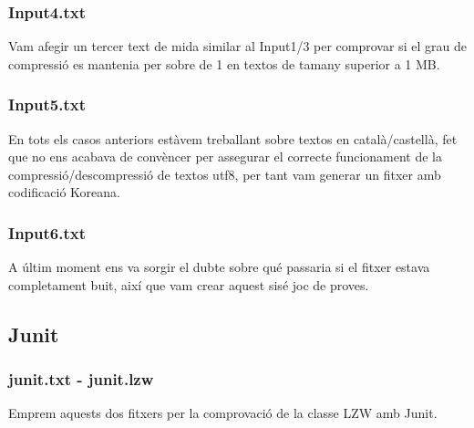 \subsubsection*{Input4.\+txt}

Vam afegir un tercer text de mida similar al Input1/3 per comprovar si el grau de compressió es mantenia per sobre de 1 en textos de tamany superior a 1 MB.

\subsubsection*{Input5.\+txt}

En tots els casos anteriors estàvem treballant sobre textos en català/castellà, fet que no ens acabava de convèncer per assegurar el correcte funcionament de la compressió/descompressió de textos utf8, per tant vam generar un fitxer amb codificació Koreana.

\subsubsection*{Input6.\+txt}

A últim moment ens va sorgir el dubte sobre qué passaria si el fitxer estava completament buit, així que vam crear aquest sisé joc de proves.

\subsection*{Junit}

\subsubsection*{junit.\+txt -\/ junit.\+lzw}

Emprem aquests dos fitxers per la comprovació de la classe L\+ZW amb Junit. 